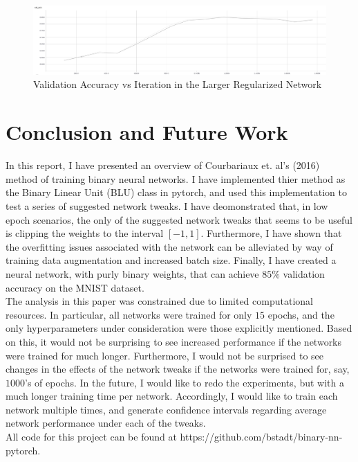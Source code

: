 \documentclass{article}
\begin{document}
    \begin{figure}[h!]
      \includegraphics[scale=.33]{img3.png}
      \caption{Validation Accuracy vs Iteration in the Larger Regularized Network} \label{figure:best}
    \end{figure}


    \section*{Conclusion and Future Work}
      In this report, I have presented an overview of Courbariaux et. al's (2016) \cite{bnn} method of training binary neural networks.
      I have implemented thier method as the Binary Linear Unit (BLU) class in pytorch, and used this implementation to test a series of suggested network tweaks.
      I have deomonstrated that, in low epoch scenarios, the only of the suggested network tweaks that seems to be useful is clipping the weights to the interval $[-1, 1]$.
      Furthermore, I have shown that the overfitting issues associated with the network can be alleviated by way of training data augmentation and increased batch size.
      Finally, I have created a neural network, with purly binary weights, that can achieve $85\%$ validation accuracy on the MNIST dataset.\\[6pt]

      The analysis in this paper was constrained due to limited computational resources.
      In particular, all networks were trained for only $15$ epochs, and the only hyperparameters under consideration were those explicitly mentioned.
      Based on this, it would not be surprising to see increased performance if the networks were trained for much longer.
      Furthermore, I would not be surprised to see changes in the effects of the network tweaks if the networks were trained for, say, $1000$'s of epochs.
      In the future, I would like to redo the experiments, but with a much longer training time per network.
      Accordingly, I would like to train each network multiple times, and generate confidence intervals regarding average network performance under each of the tweaks.\\[6pt]

      All code for this project can be found at https://github.com/bstadt/binary-nn-pytorch.


  {}
  
\end{document}
